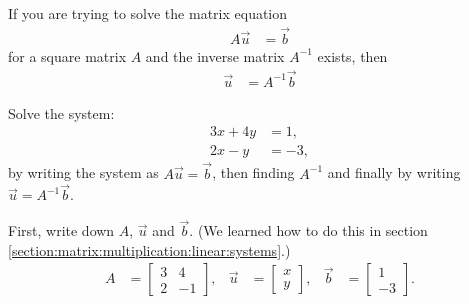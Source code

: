 \begin{Boxed*}
If you are trying to solve the matrix equation 
\begin{align*}
 A\vec{u} & = \vec{b}
\end{align*}
for a square matrix $A$ and the inverse matrix $A^{-1}$ exists, then 
% 
\begin{align*}
\vec{u} & = A^{-1} \vec{b}
\end{align*}
\end{Boxed*}


\begin{example}  \label{ex:solve:by:inverse}
Solve the system:
%
\begin{align*}
3x + 4y & = 1, \\
2x - y & = -3,
\end{align*}
by writing the system as $A \vec{u} = \vec{b}$, then finding $A^{-1}$ and finally by writing $\vec{u}  = A^{-1} \vec{b}$.  

\solution 

First, write down $A$, $\vec{u}$ and $\vec{b}$.  (We learned how to do this in section \ref{section:matrix:multiplication:linear:systems}.)
\begin{align*}
A & = \begin{bmatrix}
3 & 4 \\ 2 & -1
\end{bmatrix},
& \vec{u} &= 
\begin{bmatrix}
	x \\ y 
\end{bmatrix}, & \vec{b} & = 
\begin{bmatrix}
	1 \\ -3 
\end{bmatrix}.
\end{align*}


\end{example}
